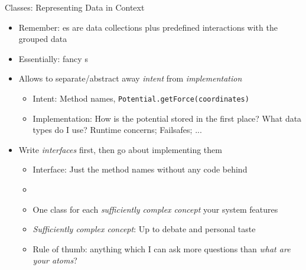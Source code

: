 
\begin{frame}{Classes: Representing Data in Context}
%
\begin{itemize}
\item Remember: es are data collections plus predefined interactions with the grouped data
\item Essentially: fancy s
\item Allows to separate/abstract away \emph{intent} from \emph{implementation}
	\begin{itemize}
	\item Intent: Method names, \zB \texttt{Potential.getForce(coordinates)}
	\item Implementation: How is the potential stored in the first place? What data types do I use? Runtime concerns; Failsafes; ...
	\end{itemize}
\item Write \emph{interfaces} first, then go about implementing them
	\begin{itemize}
	\item Interface: Just the method names without any code behind
	\item {}
	\item One class for each \emph{sufficiently complex concept} your system features
	\item \emph{Sufficiently complex concept}: Up to debate and personal taste
	\item Rule of thumb: anything which I can ask more questions than \emph{what are your atoms}?
	\end{itemize}
\end{itemize}
%
\end{frame}


